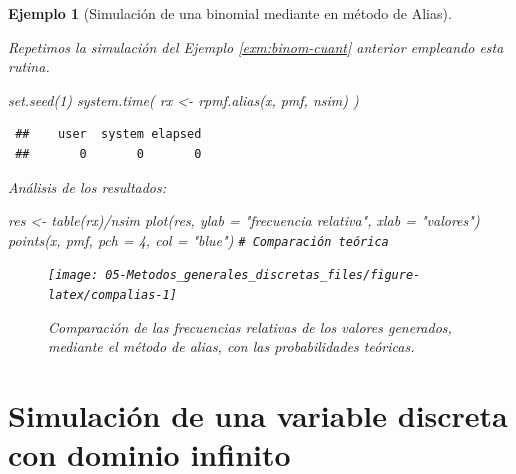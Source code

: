 \documentclass[
]{book}
\newenvironment{Shaded}{\begin{snugshade}}{\end{snugshade}}
\newcommand{\AttributeTok}[1]{\textcolor[rgb]{0.77,0.63,0.00}{#1}}
\newcommand{\CommentTok}[1]{\textcolor[rgb]{0.56,0.35,0.01}{\textit{#1}}}
\newcommand{\DecValTok}[1]{\textcolor[rgb]{0.00,0.00,0.81}{#1}}
\newcommand{\FunctionTok}[1]{\textcolor[rgb]{0.00,0.00,0.00}{#1}}
\newcommand{\NormalTok}[1]{#1}
\newcommand{\OtherTok}[1]{\textcolor[rgb]{0.56,0.35,0.01}{#1}}
\newcommand{\SpecialCharTok}[1]{\textcolor[rgb]{0.00,0.00,0.00}{#1}}
\newcommand{\StringTok}[1]{\textcolor[rgb]{0.31,0.60,0.02}{#1}}
\theoremstyle{break}
\newtheorem{example}{Ejemplo}[chapter]
\theoremstyle{nonumberplain}
\renewcommand{\CommentTok}[1]{\textcolor[rgb]{0.41,0.41,0.41}{\texttt{#1}}}
\begin{document}
\begin{example}[Simulación de una binomial mediante en método de Alias]
\protect\hypertarget{exm:binom-alias}{}\label{exm:binom-alias}

Repetimos la simulación del Ejemplo \ref{exm:binom-cuant} anterior empleando esta rutina.

\begin{Shaded}
\begin{Highlighting}[]
\FunctionTok{set.seed}\NormalTok{(}\DecValTok{1}\NormalTok{)}
\FunctionTok{system.time}\NormalTok{( rx }\OtherTok{\textless{}{-}} \FunctionTok{rpmf.alias}\NormalTok{(x, pmf, nsim) )}
\end{Highlighting}
\end{Shaded}

\begin{verbatim}
 ##    user  system elapsed 
 ##       0       0       0
\end{verbatim}

Análisis de los resultados:

\begin{Shaded}
\begin{Highlighting}[]
\NormalTok{res }\OtherTok{\textless{}{-}} \FunctionTok{table}\NormalTok{(rx)}\SpecialCharTok{/}\NormalTok{nsim}
\FunctionTok{plot}\NormalTok{(res, }\AttributeTok{ylab =} \StringTok{"frecuencia relativa"}\NormalTok{, }\AttributeTok{xlab =} \StringTok{"valores"}\NormalTok{)}
\FunctionTok{points}\NormalTok{(x, pmf, }\AttributeTok{pch =} \DecValTok{4}\NormalTok{, }\AttributeTok{col =} \StringTok{"blue"}\NormalTok{)  }\CommentTok{\# Comparación teórica}
\end{Highlighting}
\end{Shaded}

\begin{figure}[!htb]

{\centering \texttt{[image: 05-Metodos\_generales\_discretas\_files/figure-latex/compalias-1]} 

}

\caption{Comparación de las frecuencias relativas de los valores generados, mediante el método de alias, con las probabilidades teóricas.}\label{fig:compalias}
\end{figure}

\end{example}

\hypertarget{simulaciuxf3n-de-una-variable-discreta-con-dominio-infinito}{%
\section{Simulación de una variable discreta con dominio infinito}\label{simulaciuxf3n-de-una-variable-discreta-con-dominio-infinito}}
\end{document}
